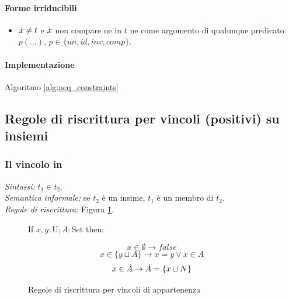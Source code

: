 \documentclass[12pt,a4paper,openright]{book} %
\begin{document}
\paragraph{Forme irriducibili}
\begin{itemize}
	\item $\dot{x} \neq t$ e $\dot{x}$ non compare ne in $t$ ne come
          argomento di qualunque predicato $p(\ldots)$, $p \in \{ un,
          id, inv, comp \}$.
\end{itemize}

\paragraph{Implementazione}
Algoritmo \ref{alg:neq_constraints}

\subsection{Regole di riscrittura per vincoli (positivi) su insiemi}
\label{subsec:clpbasedlang_lset_rewriteset}

\subsubsection{Il vincolo in}

\textit{Sintassi:} $t_1 \in t_2$.\\
\noindent\textit{Semantica informale:} se $t_2$ è un insime, $t_1$ è un membro di $t_2$.\\
\noindent\textit{Regole di riscrittura:} Figura \ref{fig:in_constraints}.

\begin{figure}
	\begin{tcolorbox}[colframe=black, colback=white, sharp corners]
		\setcounter{equation}{0}
		\renewcommand{\theequation}{$\in$\textsubscript{\arabic{equation}}}

		If $x, y: \text{U}; A: \text{Set}$ then:

		\begin{equation}
		x \in \emptyset \to false
		\end{equation}
		\begin{equation}
		x \in \{ y \sqcup A \} \to x = y \lor x \in A
		\end{equation}
		\begin{equation}
		x \in \dot{A} \to \dot{A} = \{ x \sqcup N \}
		\end{equation}

	\end{tcolorbox}

	\caption{Regole di riscrittura per vincoli di appartenenza}
	\label{fig:in_constraints}
\end{figure}
\end{document}
